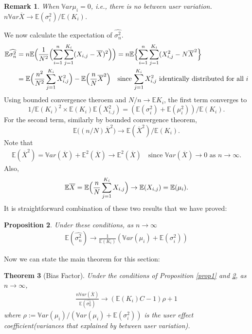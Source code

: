 \documentclass[12pt,letterpaper]{article}
\newcommand{\wht}{\widehat}
\newcommand{\var}{\ensuremath{\mathbb Var}}
\newcommand{\bbe}{\mathbb{E}}
\newcommand{\xbar}{\overline{X}}
\newcommand{\Xij}{X_{i,j}}
\newcommand{\naiveest}{\wht{\sigma^2_n}}
\newtheorem{thm}{Theorem}
\newtheorem{prop}[thm]{Proposition}
\newtheorem{rem}[thm]{Remark}
\begin{document}
\begin{rem}
When $\var \mu_i =0$, i.e., there is no between user variation. $ n\var\xbar \to \bbe(\sigma^2_i)/\bbe (K_i) $.
\end{rem}

We now calculate the expectation of $\naiveest$. 
\begin{align*}
\bbe \naiveest &= n \bbe\Bigl( \frac{1}{N^2} \Bigl (\sum_{i=1}^n \sum_{j=1}^{K_i} (X_{i,j}-\overline{X})^2 \Bigr )\Bigr) = n\bbe \Bigl \{  \sum_{i=1}^n \sum_{j=1}^{K_i} (X_{i,j}^2 - N \xbar^2  \Bigr\}\\
&= \bbe \Bigl( \frac{n^2}{N^2}  \sum_{j=1}^{K_i} \Xij^2  \Bigr) - \bbe \Bigl( \frac{n}{N}  \xbar^2  \Bigr) \quad \text{since $\sum_{j=1}^{K_i}\Xij^2$ identically distributed for all $i$}\\ 
\end{align*}
Using bounded convergence theroem and $N/n \to \bbe K_i$, the first term converges to 
\[
1/\bbe(K_i)^2 \times \bbe(K_i) \bbe(\Xij^2) = (\bbe(\sigma_i^2)+\bbe(\mu_i^2) )/\bbe(K_i).
\]
For the second term, similarly by bounded convergence theorem, 
\[\bbe \bigl((n/N) \xbar^2\bigr) \to \bbe(\xbar^2)/\bbe(K_i).\] 
Note that 
\begin{align*}
\bbe (\xbar^2) = \var(\xbar)+ \bbe^2 (\xbar)  \to \bbe^2(\xbar)  \quad \text{since $\var(\xbar) \to 0$ as $n\to \infty$}.
\end{align*}
Also, 
\begin{align*}
\bbe \xbar= \bbe \Bigl( \frac{n}{N} \sum_{j=1}^{K_i} \Xij \Bigr) \to \bbe(\Xij) = \bbe(\mu_i) . 
\end{align*} 
It is straightforward combination of these two results that we have proved: 
\begin{prop}\label{prop2}
Under these conditions, as $n\to \infty$
\begin{align}
\bbe(\naiveest) \to  \frac{1}{\bbe(K_i)} (\var(\mu_i)+\bbe(\sigma_i^2))
\end{align}
\end{prop}

Now we can state the main theorem for this section:
\begin{thm}[Bias Factor]\label{thm1}
Under the conditions of Proposition \ref{prop1} and \ref{prop2}, as $n\to \infty$, 
\begin{align}
\frac{n\var (\xbar)}{\bbe(\naiveest)} \to  (\bbe(K_i)C - 1)\rho +1
\end{align}
where $\rho:= \var(\mu_i)/(\var(\mu_i)+\bbe(\sigma^2_i))$ is the user effect coefficient(variances that explained by between user variation). 
\end{thm}
\end{document}
